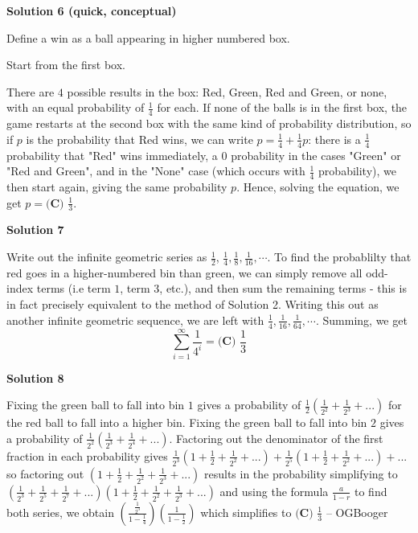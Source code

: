 \begin{enumerate}
 



\textbf{Solution 6 (quick, conceptual)}

Define a win as a ball appearing in higher numbered box.

 Start from the first box. 

 There are $4$ possible results in the box: Red, Green, Red and Green, or none, with an equal probability of $\frac{1}{4}$ for each. If none of the balls is in the first box, the game restarts at the second box with the same kind of probability distribution, so if $p$ is the probability that Red wins, we can write $p = \frac{1}{4} + \frac{1}{4}p$: there is a $\frac{1}{4}$ probability that "Red" wins immediately, a $0$ probability in the cases "Green" or "Red and Green", and in the "None" case (which occurs with $\frac{1}{4}$ probability), we then start again, giving the same probability $p$. Hence, solving the equation, we get $p = \boxed{\textbf{(C) } \frac{1}{3}}$.

 



\textbf{Solution 7}

Write out the infinite geometric series as $\frac{1}{2}$, $\frac{1}{4}, \frac{1}{8}, \frac{1}{16}, \cdots$. To find the probablilty that red goes in a higher-numbered bin than green, we can simply remove all odd-index terms (i.e term $1$, term $3$, etc.), and then sum the remaining terms - this is in fact precisely equivalent to the method of Solution 2. Writing this out as another infinite geometric sequence, we are left with $\frac{1}{4}, \frac{1}{16}, \frac{1}{64}, \cdots$. Summing, we get 
 \[\sum_{i=1}^{\infty} \frac{1}{4^i} = \boxed{\textbf{(C) } \frac{1}{3}}\]




\textbf{Solution 8}

Fixing the green ball to fall into bin $1$ gives a probability of $\frac{1}{2}\left(\frac{1}{2^2}+\frac{1}{2^3} +...\right)$ for the red ball to fall into a higher bin. Fixing the green ball to fall into bin $2$ gives a probability of $\frac{1}{2^2}\left(\frac{1}{2^3}+\frac{1}{2^4} +...\right)$. Factoring out the denominator of the first fraction in each probability gives $\frac{1}{2^3}\left(1+\frac{1}{2}+\frac{1}{2^2}+...\right)+\frac{1}{2^5}\left(1+\frac{1}{2}+\frac{1}{2^2}+...\right)+...$ so factoring out $\left(1+\frac{1}{2}+\frac{1}{2^2}+\frac{1}{2^3}+...\right)$ results in the probability simplifying to $\left(\frac{1}{2^3}+\frac{1}{2^5}+\frac{1}{2^7}+...\right)\left(1+\frac{1}{2}+\frac{1}{2^2}+\frac{1}{2^3}+...\right)$ and using the formula $\frac{a}{1-r}$ to find both series, we obtain $\left(\frac{\frac{1}{2^3}}{1-\frac{1}{4}}\right)\left(\frac{1}{1-\frac{1}{2}}\right)$ which simplifies to $\boxed{\textbf{(C) } \frac{1}{3}}$ -- OGBooger


\end{enumerate}

